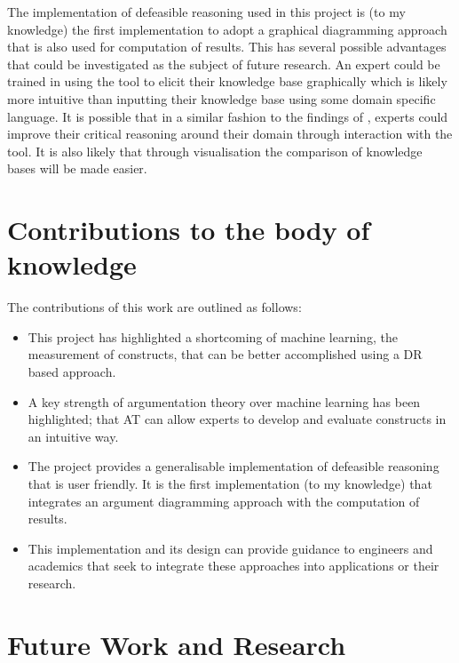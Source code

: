 The implementation of defeasible reasoning used in this project is (to my knowledge) the first implementation to adopt a graphical diagramming approach that is also used for computation of results. This has several possible advantages that could be investigated as the subject of future research. An expert could be trained in using the tool to elicit their knowledge base graphically which is likely more intuitive than inputting their knowledge base using some domain specific language. It is possible that in a similar fashion to the findings of \cite{twardy2004argument}, experts could improve their critical reasoning around their domain through interaction with the tool. It is also likely that through visualisation the comparison of knowledge bases will be made easier. 

\section{Contributions to the body of knowledge}

The contributions of this work are outlined as follows:

\begin{itemize}
\item This project has highlighted a shortcoming of machine learning, the measurement of constructs, that can be better accomplished using a DR based approach.
\item A key strength of argumentation theory over machine learning has been highlighted; that AT can allow experts to develop and evaluate constructs in an intuitive way.
\item The project provides a generalisable implementation of defeasible reasoning that is user friendly. It is the first implementation (to my knowledge) that integrates an argument diagramming approach with the computation of results.
\item This implementation and its design can provide guidance to engineers and academics that seek to integrate these approaches into applications or their research.
\end{itemize}

\section{Future Work and Research}

